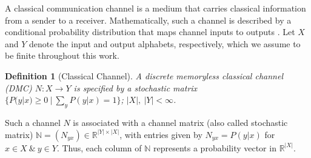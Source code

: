 \documentclass[12pt,a4paper]{article}
\newtheorem{definition}{Definition}
\begin{document}
\noindent A classical communication channel is a medium that carries classical information from a sender to a receiver. Mathematically, such a channel is described by a conditional probability distribution that maps channel inputs to outputs \cite{Cover2005}. Let $X$ and $Y$ denote the input and output alphabets, respectively, which we assume to be finite throughout this work.



\begin{definition}[Classical Channel]\label{def1}
A discrete memoryless classical channel (DMC) $N: X\to Y$ is specified by a stochastic matrix $\{P(y|x)\ge0~|~\sum_yP(y|x)=1\}$; $|X|,~|Y|<\infty$.
\end{definition}
\noindent Such a channel $N$ is associated with a  channel matrix (also called stochastic matrix)  $\mathbb{N}=(N_{yx})\in\mathbb{R}^{|Y|\times|X|}$, with entries given by $N_{yx}= P(y|x)$ for $x\in X~\&~y\in Y$. Thus, each column of $\mathbb{N}$ represents a probability vector in $\mathbb{R}^{|X|}$. 
\end{document}
